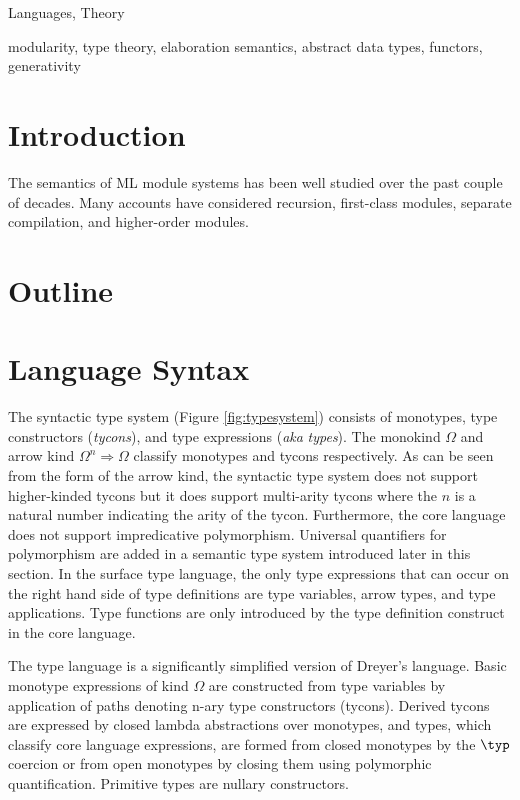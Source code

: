 \documentclass[9pt,nocopyrightspace, fleqn]{sigplanconf}
\begin{document}
\terms 
Languages, Theory

\keywords
modularity, type theory, elaboration semantics, abstract data types, functors, generativity

\section{Introduction}

The semantics of ML module systems \cite{macqueen:popl86} has been
well studied over the past couple of decades. Many accounts have
considered recursion, first-class modules, separate compilation, and
higher-order modules. 

\section{Outline}


\section{Language Syntax}


The syntactic type system (Figure \ref{fig:typesystem}) consists of
monotypes, type constructors (\emph{tycons}), and type expressions
(\emph{aka} \emph{types}). The monokind $\Omega$ and arrow kind $\Omega^n
\Rightarrow \Omega$ classify monotypes and tycons respectively. As can
be seen from the form of the arrow kind, the syntactic type system
does not support higher-kinded tycons but it does support multi-arity
tycons where the $n$ is a natural number indicating the arity of the
tycon. Furthermore, the core language does not support impredicative
polymorphism. Universal quantifiers for polymorphism are added in a
semantic type system introduced later in this section. In the surface
type language, the only type expressions that can occur on the right
hand side of type definitions are type variables, arrow types, and
type applications. Type functions are only introduced by the type
definition construct in the core language.



The type language is a significantly simplified version of Dreyer's
language\cite{dreyerthesis}.  Basic monotype expressions of kind
$\Omega$ are constructed from type variables by application of paths
denoting n-ary type constructors (tycons).  Derived tycons are
expressed by closed lambda abstractions over monotypes, and types,
which classify core language expressions, are formed from closed
monotypes by the $\typ$ coercion or from open monotypes by closing 
them using polymorphic quantification.  Primitive types are nullary constructors.
\end{document}
